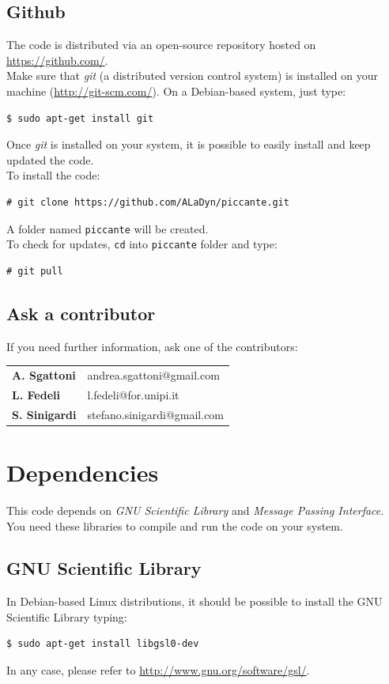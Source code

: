 \documentclass[11pt,a4paper]{report}
\begin{document}
\subsection{Github}  
The code is distributed via an open-source repository hosted on \url{https://github.com/}.\\
Make sure that \emph{git} (a distributed version control system) is installed on your machine (\url{http://git-scm.com/}).
On a Debian-based system, just type:
\begin{verbatim}
$ sudo apt-get install git
\end{verbatim}
Once \emph{git} is installed on your system, it is possible to easily install and keep updated the code.\\
To install the code:
\begin{verbatim}
# git clone https://github.com/ALaDyn/piccante.git
\end{verbatim}
A folder named \verb+piccante+ will be created.\\
To check for updates, \verb+cd+ into \verb+piccante+ folder and type:
\begin{verbatim}
# git pull
\end{verbatim}

\subsection{Ask a contributor}
If you need further information, ask one of the contributors:
\begin{center}
    \begin{tabular}{ l | l }
    	\textbf{A. Sgattoni} & andrea.sgattoni@gmail.com\\
    	\textbf{L. Fedeli} & l.fedeli@for.unipi.it  \\
    	\textbf{S. Sinigardi} & stefano.sinigardi@gmail.com 
    \end{tabular}
\end{center}

\section{Dependencies}
This code depends on \emph{GNU Scientific Library} and \emph{Message Passing Interface}. You need these libraries to compile and run the code on your system.
\subsection{GNU Scientific Library}
In Debian-based Linux distributions, it should be possible to install the GNU Scientific Library typing:
\begin{verbatim}
$ sudo apt-get install libgsl0-dev
\end{verbatim}
In any case, please refer to \url{http://www.gnu.org/software/gsl/}.
\end{document}
